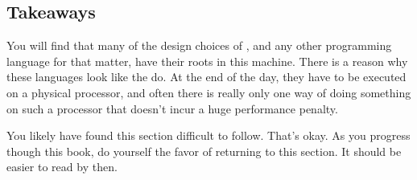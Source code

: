 \subsection{Takeaways}

You will find that many of the design choices of \csharp, and any other programming language for that matter, have their roots in this machine. There is a reason why these languages look like the do. At the end of the day, they have to be executed on a physical processor, and often there is really only one way of doing something on such a processor that doesn't incur a huge performance penalty.

You likely have found this section difficult to follow. That's okay. As you progress though this book, do yourself the favor of returning to this section. It should be easier to read by then.

